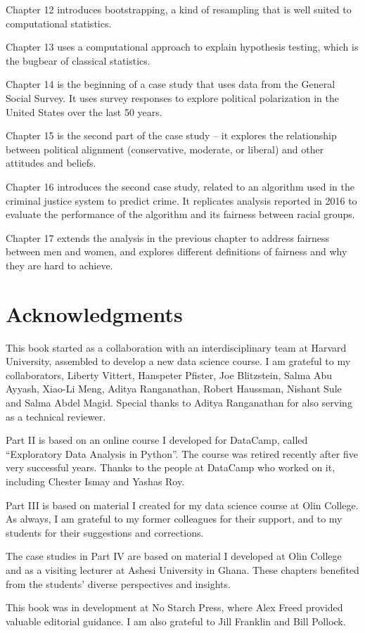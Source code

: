 \begin{description}
\item Chapter 12 introduces bootstrapping, a kind of resampling that is
well suited to computational statistics.

\item Chapter 13 uses a computational approach to explain hypothesis testing, which is the bugbear of classical statistics.

\item Chapter 14 is the beginning of a case study that uses data from the General Social Survey. It uses survey responses to explore political polarization in the United States over the last 50 years.

\item Chapter 15 is the second part of the case study -- it explores the relationship between political alignment (conservative, moderate, or liberal) and other attitudes and beliefs.

\item Chapter 16 introduces the second case study, related to an algorithm used in the criminal justice system to predict crime. It replicates analysis reported in 2016 to evaluate the performance of the algorithm and its fairness between racial groups.

\item Chapter 17 extends the analysis in the previous chapter to address fairness between men and women, and explores different definitions of fairness and why they are hard to achieve.

\end{description}


\section*{Acknowledgments}

This book started as a collaboration with an interdisciplinary team at Harvard University, assembled to develop a new data science course. I am grateful to my collaborators, Liberty Vittert, Hanspeter Pfister, Joe Blitzstein, Salma Abu Ayyash, Xiao-Li Meng, Aditya Ranganathan, Robert Haussman, Nishant Sule and Salma Abdel Magid. Special thanks to Aditya Ranganathan for also serving as a technical reviewer.

Part II is based on an online course I developed for DataCamp, called ``Exploratory Data Analysis in Python''. The course was retired recently after five very successful years. Thanks to the people at DataCamp who worked on it, including Chester Ismay and Yashas Roy.

Part III is based on material I created for my data science course at Olin College. As always, I am grateful to my former colleagues for their support, and to my students for their suggestions and corrections.

The case studies in Part IV are based on material I developed at Olin College and as a visiting lecturer at Ashesi University in Ghana. These chapters benefited from the students' diverse perspectives and insights.

This book was in development at No Starch Press, where Alex Freed provided valuable editorial guidance. I am also grateful to Jill Franklin and Bill Pollock.
